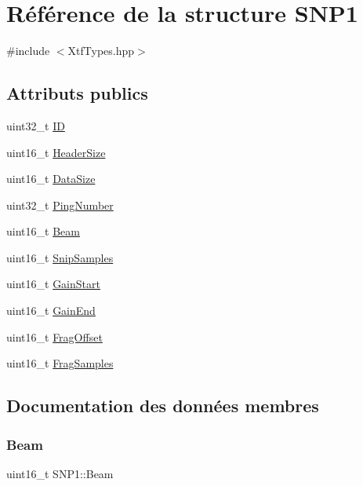 \hypertarget{structSNP1}{}\section{Référence de la structure S\+N\+P1}
\label{structSNP1}


{\ttfamily \#include $<$Xtf\+Types.\+hpp$>$}

\subsection*{Attributs publics}
\begin{DoxyCompactItemize}
\item 
uint32\+\_\+t \hyperlink{structSNP1_ae831f0f3db4684dc376a024baeb78177}{ID}
\item 
uint16\+\_\+t \hyperlink{structSNP1_adbfcf4adc5b40b66c93b6ba29614e676}{Header\+Size}
\item 
uint16\+\_\+t \hyperlink{structSNP1_a410d96cbff9feb7a9a86dd79db7f3222}{Data\+Size}
\item 
uint32\+\_\+t \hyperlink{structSNP1_acf218e8c904b3fd1070a2d1953fbab97}{Ping\+Number}
\item 
uint16\+\_\+t \hyperlink{structSNP1_ade91373e79d5eb32e5a0bbb8b9832b72}{Beam}
\item 
uint16\+\_\+t \hyperlink{structSNP1_a56b038e82536d0cd2f6f65dac10b76aa}{Snip\+Samples}
\item 
uint16\+\_\+t \hyperlink{structSNP1_a7143f99165c37cbb26caa5c92955f1fa}{Gain\+Start}
\item 
uint16\+\_\+t \hyperlink{structSNP1_ade59225835d0a113e80f1d1f3f2f00e4}{Gain\+End}
\item 
uint16\+\_\+t \hyperlink{structSNP1_a2bcf51d775dc18ca4dac4920215770ca}{Frag\+Offset}
\item 
uint16\+\_\+t \hyperlink{structSNP1_a2568a5fb3306a9fd1f5fad4f11430676}{Frag\+Samples}
\end{DoxyCompactItemize}


\subsection{Documentation des données membres}
\mbox{\label{structSNP1_ade91373e79d5eb32e5a0bbb8b9832b72}} 
\subsubsection{\texorpdfstring{Beam}{Beam}}
{\footnotesize\ttfamily uint16\+\_\+t S\+N\+P1\+::\+Beam}

